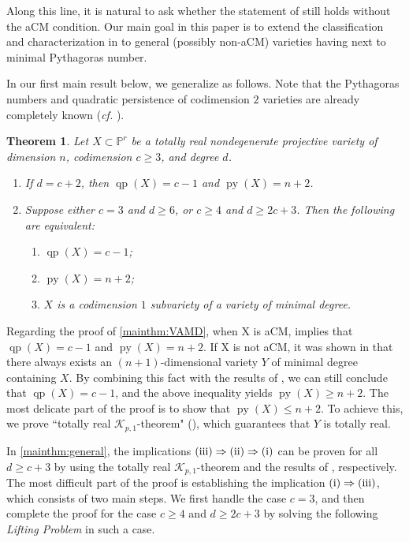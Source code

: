\documentclass[11pt,letterpaper,reqno]{amsart}
\theoremstyle{plain}
\newtheorem{theorem}{Theorem}[section]
\theoremstyle{definition}
\newtheorem{open problem}[theorem]{Open Problem}
\newtheorem{remark and notation}[theorem]{Remark and Notation}
\newtheorem{remark and definition}[theorem]{Remark and Definition}
\newtheorem{definition and notation}[theorem]{Definition and Notation}
\newtheorem{notation and convention}[theorem]{Notation and Convention}
\newtheorem{notation and remark}[theorem]{Notation and Remark}
\newtheorem{convention and notation}[theorem]{Convention and Notation}
\def \p {\mathbb{P}}
\def \py {\operatorname{py}}
\def \qp {\operatorname{qp}}
\begin{document}
Along this line, it is natural to ask whether the statement of  still holds without the aCM condition.
Our main goal in this paper is to extend the classification and characterization in  to general (possibly non-aCM) varieties having next to minimal Pythagoras number.

In our first main result below, we generalize  as follows.
Note that the Pythagoras numbers and quadratic persistence of codimension $2$ varieties are already completely known (\textit{cf.} ).
\begin{theorem}\label{mainthm}
    Let $X\subset \p^{r}$ be a totally real nondegenerate projective variety of dimension $n$, codimension $c\geq 3$, and degree $d$.
    \begin{enumerate}[\rm (1)]
        \item\label{mainthm:VAMD} If $d=c+2$, then $\qp(X) = c - 1$ and $\py(X) = n +2$.
        \item\label{mainthm:general} Suppose either $c = 3$ and $d \geq 6$, or $c \geq 4$ and $d \geq 2c+3$.
        Then the following are equivalent:
        \begin{enumerate}[\rm (i)]
            \item $\qp(X) = c-1$;
            \item $\py(X) = n+2$;
            \item $X$ is a codimension $1$ subvariety of a variety of minimal degree.
        \end{enumerate}
    \end{enumerate}
\end{theorem}

Regarding the proof of  \eqref{mainthm:VAMD}, when X is aCM,  implies that $\qp(X) = c-1$ and $\py(X) = n+2$. 
If X is not aCM, it was shown in \cite{MR2274517} that there always exists an $(n+1)$-dimensional variety $Y$ of minimal degree containing $X$.
By combining this fact with the results of \cite{MR4397034}, we can still conclude that $\qp(X) = c-1$, and the above inequality yields $\py(X) \geq  n+2$. 
The most delicate part of the proof is to show that $\py(X) \leq n+2$. 
To achieve this, we prove ``totally real $\mathcal{K}_{p,1}$-theorem" (), which guarantees that $Y$ is totally real.

In  \eqref{mainthm:general}, the implications $\rm{(iii)}\Rightarrow\rm{(ii)}\Rightarrow \rm{(i)}$ can be proven for all $d \geq c+3$ by using the totally real $\mathcal{K}_{p,1}$-theorem and the results of \cite{MR4397034}, respectively. 
The most difficult part of the proof is establishing the implication $\rm{(i)}\Rightarrow\rm{(iii)}$, which consists of two main steps. 
We first handle the case $c = 3$, and then complete the proof for the case $c \geq 4$ and $d\geq 2c+3$ by solving the following \emph{Lifting Problem} in such a case. \\
\end{document}
